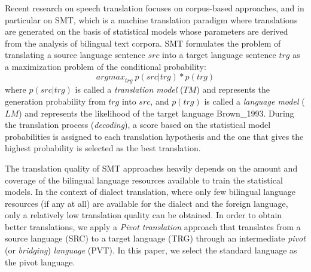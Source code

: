 \documentclass[english]{jnlp_1.4}
\renewcommand{\shortcite}{}
\begin{document}
 Recent research on speech translation focuses on corpus-based approaches, and in particular on SMT,
 which is a machine translation paradigm where translations are generated on the basis of statistical
 models whose parameters are derived from the analysis of bilingual text corpora. SMT formulates the problem of translating
 a source language sentence $\mathit{src}$ into a target language sentence $\mathit{trg}$ as a maximization problem
 of the conditional probability:
\begin{equation}
  \mathit{argmax}_\mathit{trg} \ p(\mathit{src}|\mathit{trg}) * p(\mathit{trg})
\end{equation}
where $p(\mathit{src}|\mathit{trg})$ is called a {\em translation model} ($TM$) and represents the generation probability from $\mathit{trg}$ into $\mathit{src}$,
 and $p(\mathit{trg})$ is called a {\em language model} ($LM$) and represents the likelihood of the target language \shortcite{Brown_1993}.
 During the translation process ({\em decoding}), a score based on the statistical model probabilities is assigned
 to each translation hypothesis and the one that gives the highest probability is selected as the best translation.

 The translation quality of SMT approaches heavily depends on the amount and coverage of the bilingual language
 resources available to train the statistical models. In the context of dialect translation, where only
 few bilingual language resources (if any at all) are available for the dialect and the foreign language,
 only a relatively low translation quality can be obtained.
 In order to obtain better translations, we apply a {\em Pivot translation} approach that translates
 from a source language (SRC) to a target language (TRG) through an intermediate {\em pivot} (or {\em bridging})
 {\em language} (PVT). In this paper, we select the standard language as the pivot language.
\end{document}
